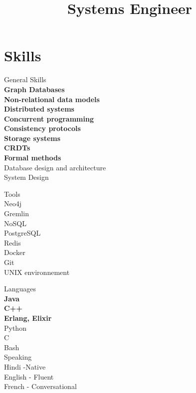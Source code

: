 \documentclass[10pt,a4paper,sans]{moderncv}        %
\title{Systems Engineer}
\begin{document}
\makecvtitle

\vspace{-1cm}

\section{Skills}
\closesection{}


\begin{multicols}{3}
    {\large \color{color1} General Skills}\\
    \textbf{Graph Databases}\\
    \textbf{Non-relational data models}\\
    \textbf{Distributed systems}\\
    \textbf{Concurrent programming}\\
    \textbf{Consistency protocols}\\
    \textbf{Storage systems}\\
    \textbf{CRDTs}\\
    \textbf{Formal methods}\\
    Database design and architecture\\
    System Design
    

\vfill\null\columnbreak


{\large \color{color1}  Tools} \\
    Neo4j\\
    Gremlin\\
    NoSQL\\
    PostgreSQL\\
    Redis\\
    Docker\\ 
    Git\\ 
    UNIX environnement\\ 

\vfill\null\columnbreak

{\large \color{color1}  Languages}\\
\textbf{Java}\\ 
\textbf{C++}\\
\textbf{Erlang, Elixir}\\
Python\\
C\\
Bash\\

{\large \color{color1} Speaking}\\
    Hindi -Native\\
    English - Fluent\\
    French - Conversational\\    

\vfill\null\columnbreak

\end{multicols}
\end{document}
